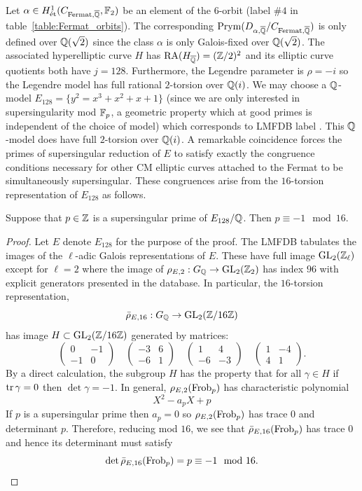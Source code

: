 \documentclass[main.tex]{subfiles}
\begin{document}
Let $\alpha \in H^1_{\mathrm{\acute{e}t}}(C_{\mathrm{Fermat}, \overline{\mathbb{Q}}}, \mathbb{F}_2)$ be an element of the $6$-orbit (label $\# 4$ in table~\ref{table:Fermat_orbits}). The corresponding $\operatorname{\mathrm{Prym}}(D_{\alpha, \overline{\mathbb{Q}}} / C_{\mathrm{Fermat},\overline{\mathbb{Q}}})$ is only defined over $\mathbb{Q}(\sqrt{2})$ since the class $\alpha$ is only Galois-fixed over $\mathbb{Q}(\sqrt{2})$. The associated hyperelliptic curve $H$ has $\operatorname{\mathrm{RA}}(H_{\overline{\mathbb{Q}}}) = (\mathbb{Z}/2)^2$ and its elliptic curve quotients both have $j = 128$. Furthermore, the Legendre parameter is $\rho = -i$ so the Legendre model has full rational $2$-torsion over $\mathbb{Q}(i)$. We may choose a $\mathbb{Q}$-model $E_{128} = \{y^2 = x^3 + x^2 + x + 1\}$ (since we are only interested in supersingularity mod $\mathbb{F}_p$, a geometric property which at good primes is independent of the choice of model) which corresponds to LMFDB label \cite{lmfdb:ec-128.a2}. This $\mathbb{Q}$-model does have full $2$-torsion over $\mathbb{Q}(i)$. A remarkable coincidence forces the primes of supersingular reduction of $E$ to satisfy exactly the congruence conditions necessary for other CM elliptic curves attached to the Fermat to be simultaneously supersingular. These congruences arise from the $16$-torsion representation of $E_{128}$ as follows.

\begin{theorem} \label{thm:Fermat_congruence}
Suppose that $p \in \mathbb{Z}$ is a supersingular prime of $E_{128} / \mathbb{Q}$. Then $p \equiv -1 \mod 16$.
\end{theorem}

\begin{proof}
Let $E$ denote $E_{128}$ for the purpose of the proof. The LMFDB tabulates the images of the $\ell$-adic Galois representations of $E$. These have full image $\mathrm{GL}_2(\mathbb{Z}_{\ell})$ except for $\ell = 2$ where the image of $\rho_{E, 2} : G_{\mathbb{Q}} \to \mathrm{GL}_2(\mathbb{Z}_2)$ has index $96$ with explicit generators presented in the database. In particular, the $16$-torsion representation,
\[ \bar{\rho}_{E,16} : G_{\mathbb{Q}} \to \mathrm{GL}_2(\mathbb{Z} / 16\mathbb{Z}) \]
has image $H \subset \mathrm{GL}_2(\mathbb{Z} / 16 \mathbb{Z})$ generated by matrices:
\[ 
\begin{pmatrix}
0 & - 1
\\
- 1 & 0
\end{pmatrix}
\quad 
\begin{pmatrix}
-3 & 6
\\
-6 & 1
\end{pmatrix}
\quad 
\begin{pmatrix}
1 & 4
\\
-6 & -3
\end{pmatrix}
\quad 
\begin{pmatrix}
1 & -4
\\
4 & 1
\end{pmatrix}. \]
By a direct calculation, the subgroup $H$ has the property that for all $\gamma \in H$ if $\operatorname{\mathrm{tr}}{\gamma} = 0$ then $\det{\gamma} = -1$. In general, $\rho_{E,2}(\operatorname{\mathrm{Frob}}_p)$ has characteristic polynomial
\[ X^2 - a_p X + p \]
If $p$ is a supersingular prime then $a_p = 0$ so $\rho_{E,2}(\operatorname{\mathrm{Frob}}_p)$ has trace $0$ and determinant $p$. Therefore, reducing mod $16$, we see that $\bar{\rho}_{E,16}(\operatorname{\mathrm{Frob}}_p)$ has trace $0$ and hence its determinant must satisfy
\[ \det{\bar{\rho}_{E,16}(\operatorname{\mathrm{Frob}}_p)} = p \equiv -1 \mod 16. \]
\end{proof}
\end{document}
